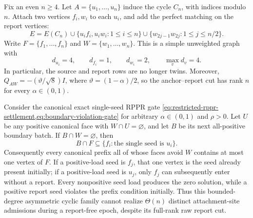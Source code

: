 \begin{proposition}
\label{prop:matched-report-sun-gate-obstruction}
Fix an even $n\geq4$.  Let
$A=\{u_1,\ldots,u_n\}$ induce the cycle $C_n$, with indices modulo $n$.
Attach two vertices $f_i,w_i$ to each $u_i$, and add the perfect matching
on the report vertices:
\begin{equation}
 E=E(C_n)\cup\{u_if_i,u_iw_i:1\leq i\leq n\}
   \cup\{w_{2j-1}w_{2j}:1\leq j\leq n/2\}.
 \label{eq:matched-report-sun-edges}
\end{equation}
Write $F=\{f_1,\ldots,f_n\}$ and $W=\{w_1,\ldots,w_n\}$.
This is a simple unweighted graph with
\begin{equation*}
 d_{u_i}=4,\qquad d_{f_i}=1,\qquad d_{w_i}=2,
 \qquad \max_v d_v=4.
\end{equation*}
In particular, the source and report rows are no longer twins.  Moreover,
$Q_{AW}=-(\vartheta/\sqrt8)I$, where
$\vartheta=(1-\alpha)/2$, so the anchor--report cut has rank $n$ for every
$\alpha\in(0,1)$.

Consider the canonical exact single-seed RPPR gate
\cref{eq:restricted-rppr-settlement,eq:boundary-violation-gate} for arbitrary
$\alpha\in(0,1)$ and $\rho>0$.  Let $U$ be any positive canonical face with
$W\cap U=\varnothing$, and let $B$ be its next all-positive boundary batch.
If $B\cap W=\varnothing$, then
\begin{equation}
 B\cap F\subseteq\{f_i:\text{the single seed is }u_i\}.
 \label{eq:matched-report-sun-only-seed-petal}
\end{equation}
Consequently every canonical prefix all of whose faces avoid $W$ contains at
most one vertex of $F$.  If a positive-load seed is $f_j$, that one vertex is
the seed already present initially; if a positive-load seed is $u_j$, only
$f_j$ can subsequently enter without a report.  Every nonpositive seed load
produces the zero solution, while a positive report seed violates the prefix
condition initially.
Thus this bounded-degree asymmetric cyclic family cannot realize
$\Theta(n)$ distinct attachment-site admissions during a report-free epoch,
despite its full-rank raw report cut.
\end{proposition}

